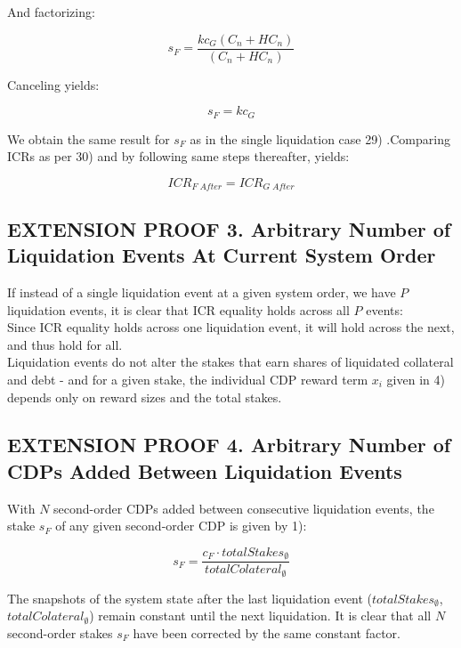 \documentclass[reqno]{article}
\begin{document}
\bigskip
And factorizing:

\begin{equation} 
    s_F=\frac{kc_G(C_n+HC_n)}{(C_n+HC_n)}
\end{equation}

\bigskip
Canceling yields:

\begin{equation} 
    s_F=kc_G
\end{equation}

\bigskip
We obtain the same result for $s_F$ as in the single liquidation case 29) .Comparing ICRs as per 30) and by following same steps thereafter, yields:

\begin{equation} 
    ICR_{F \; After}=ICR_{G \; After}
\end{equation}

\bigskip
\subsection*{EXTENSION PROOF 3. Arbitrary Number of Liquidation Events At Current System Order}

If instead of a single liquidation event at a given system order, we have $P$ liquidation events, it is clear that ICR equality holds across all $P$ events:\\

Since ICR equality holds across one liquidation event, it will hold across the next, and thus hold for all.\\

Liquidation events do not alter the stakes that earn shares of liquidated collateral and debt - and for a given stake, the individual CDP reward term $x_i$ given in 4) depends only on reward sizes and the total stakes.

\bigskip
\subsection*{EXTENSION PROOF 4. Arbitrary Number of CDPs Added Between Liquidation Events}

With $N$ second-order CDPs added between consecutive liquidation events, the stake $s_F$ of any given second-order CDP is given by 1): 

\begin{equation} 
    s_F=\frac{c_F \cdot totalStakes_\emptyset}{totalColateral_\emptyset}
\end{equation}

\bigskip
The snapshots of the system state after the last liquidation event ($totalStakes_\emptyset$, $totalColateral_\emptyset$) remain constant until the next liquidation. It is clear that all $N$ second-order stakes $s_F$ have been corrected by the same constant factor.\\
\end{document}
